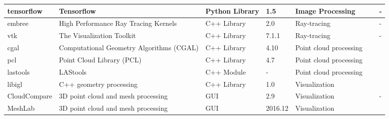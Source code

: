 \begin{table}[!htb]
\begin{tabular}{L{1.8cm}|L{3.2cm}|C{1.8cm}|C{0.9cm}|C{1.4cm}|C{0.8cm}|L{2.5cm}}
	      tensorflow & Tensorflow & Python Library & 1.5 & Image Processing & \href{https://github.com/tensorflow/tensorflow}{\faGithub}$~~$\href{https://github.com/tensorflow}{\faLink} & -\\ \hline	      
	      embree & High Performance Ray Tracing Kernels & C++ Library & 2.0 & Ray-tracing & \href{https://github.com/embree}{\faGithub}$~~$\href{https://embree.github.io/}{\faLink} & -\\ 
	      vtk & The Visualization Toolkit & C++ Library & 7.1.1 & Ray-tracing & \href{https://github.com/Kitware/VTK}{\faGithub}$~~$\href{https://www.vtk.org/Wiki/VTK}{\faLink} & - \\ \hline
	      cgal & Computational Geometry Algorithms (CGAL) & C++ Library & 4.10 & Point cloud processing & \href{https://github.com/CGAL/cgal}{\faGithub}$~~$\href{http://www.cgal.org}{\faLink} & \cite{cgal410} \\ 
	      pcl & Point Cloud Library (PCL) & C++ Library & 4.7 & Point cloud processing & \href{https://github.com/PointCloudLibrary}{\faGithub}$~~$\href{http://pointclouds.org}{\faLink} & \cite{pcl2011} \\
	      lastools & LAStools & C++ Module & - & Point cloud processing & \href{https://github.com/LAStools/LAStools}{\faGithub}$~~$\href{https://rapidlasso.com}{\faLink} & \cite{rapidlasso} \\
	      libigl & C++ geometry processing & C++ Library & 1.0 & Visualization & \href{https://github.com/libigl/libigl}{\faGithub}$~~$\href{http://libigl.github.io/libigl/tutorial/}{\faLink} & \cite{libigl} \\
	      CloudCompare & 3D point cloud and mesh processing & GUI & 2.9 & Visualization & \href{https://github.com/CloudCompare/CloudCompare}{\faGithub}$~~$\href{http://www.cloudcompare.org}{\faLink} & - \\ 
	      MeshLab & 3D point cloud and mesh processing & GUI & 2016.12 & Visualization & \href{https://github.com/cnr-isti-vclab/meshlab}{\faGithub}$~~$\href{http://www.meshlab.net}{\faLink} & \cite{meshlab} \\  
	      \bottomrule
      \end{tabular}
      \label{tools-used}
    \end{table}

